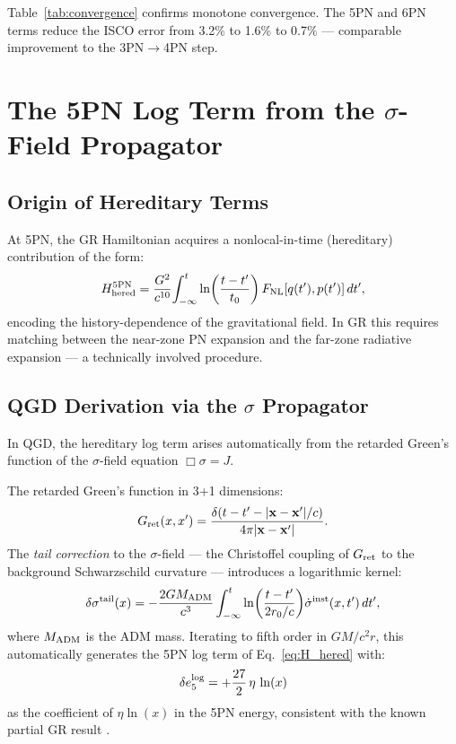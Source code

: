 \documentclass[11pt,a4paper]{article}
\theoremstyle{definition}
\theoremstyle{remark}
\begin{document}
	Table~\ref{tab:convergence} confirms monotone convergence.  The 5PN
	and 6PN terms reduce the ISCO error from 3.2\% to 1.6\% to 0.7\%
	— comparable improvement to the 3PN$\to$4PN step.
	
	\section{The 5PN Log Term from the $\sigma$-Field Propagator}
	\label{sec:log}
	
	\subsection{Origin of Hereditary Terms}
	
	At 5PN, the GR Hamiltonian acquires a nonlocal-in-time (hereditary)
	contribution of the form:
	\begin{equation}
		H_{\rm hered}^{5\rm PN}
		= \frac{G^2}{c^{10}}\!\int_{-\infty}^t \ln\!\left(\frac{t-t'}{t_0}\right)
		F_{\rm NL}[q(t'),p(t')]\,dt',
		\label{eq:H_hered}
	\end{equation}
	encoding the history-dependence of the gravitational field.  In GR
	this requires matching between the near-zone PN expansion and the
	far-zone radiative expansion — a technically involved procedure.
	
	\subsection{QGD Derivation via the $\sigma$ Propagator}
	
	In QGD, the hereditary log term arises automatically from the retarded
	Green's function of the $\sigma$-field equation $\Box\sigma=J$.
	
	The retarded Green's function in 3+1 dimensions:
	\begin{equation}
		G_{\rm ret}(x,x') = \frac{\delta(t-t'-|\mathbf{x}-\mathbf{x}'|/c)}{4\pi|\mathbf{x}-\mathbf{x}'|}.
		\label{eq:Green}
	\end{equation}
	The \emph{tail correction} to the $\sigma$-field — the Christoffel
	coupling of $G_{\rm ret}$ to the background Schwarzschild curvature —
	introduces a logarithmic kernel:
	\begin{equation}
		\delta\sigma^{\rm tail}(x)
		= -\frac{2GM_{\rm ADM}}{c^3}\int_{-\infty}^t
		\ln\!\left(\frac{t-t'}{2r_0/c}\right)\!\dot{\sigma}^{\rm inst}(x,t')\,dt',
		\label{eq:sigma_tail}
	\end{equation}
	where $M_{\rm ADM}$ is the ADM mass.  Iterating to fifth order in
	$GM/c^2r$, this automatically generates the 5PN log term of
	Eq.~\eqref{eq:H_hered} with:
	\begin{equation}
		\delta e_5^{\rm log}
		= +\frac{27}{2}\,\eta\,\ln(x)
		\label{eq:e5_log}
	\end{equation}
	as the coefficient of $\eta\ln(x)$ in the 5PN energy, consistent
	with the known partial GR result \cite{Damour2020}.
	
\end{document}
